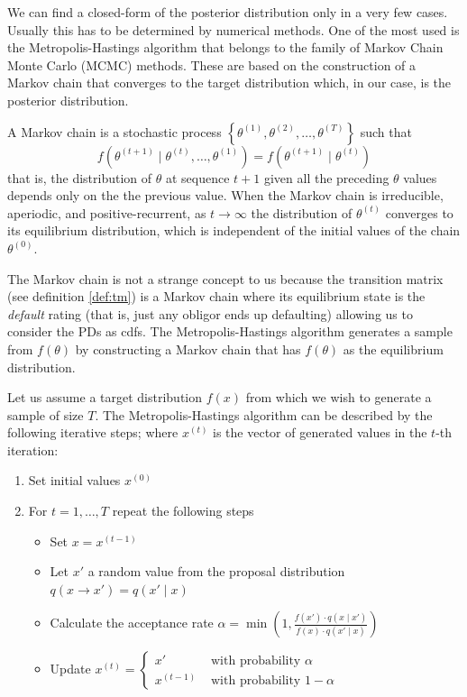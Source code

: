 \documentclass[11pt,fleqn]{book} %
\begin{document}
We can find a closed-form of the posterior distribution only in a very few 
cases. Usually this has to be determined by numerical methods. 
One of the most used is the Metropolis-Hastings algorithm that belongs to 
the family of Markov Chain Monte Carlo (MCMC) methods. These are based on 
the construction of a Markov chain that converges to the target distribution 
which, in our case, is the posterior distribution.

\begin{definition}
	A Markov chain is a stochastic process 
	$\left\{\theta^{(1)},\theta^{(2)},\dots,\theta^{(T)}\right\}$ such that
	\begin{displaymath}
		f\left(\theta^{(t+1)} \mid \theta^{(t)},\dots,\theta^{(1)}\right) = 
		f\left(\theta^{(t+1)} \mid \theta^{(t)}\right)
	\end{displaymath}
	that is, the distribution of $\theta$ at sequence $t+1$ given all the 
	preceding $\theta$ values depends only on the the previous value. 
	When the Markov chain is irreducible, aperiodic, and positive-recurrent, 
	as $t \to \infty$ the distribution of $\theta^{(t)}$ converges to its 
	equilibrium distribution, which is independent of the initial values 
	of the chain $\theta^{(0)}$.
\end{definition}

The Markov chain is not a strange concept to us because the transition 
matrix (see definition \ref{def:tm}) is a Markov chain where its 
equilibrium state is the \emph{default} rating (that is, just any 
obligor ends up defaulting) allowing us to consider the PDs as cdfs.
The Metropolis-Hastings algorithm generates a sample from $f(\theta)$ 
by constructing a Markov chain that has $f(\theta)$ as the equilibrium 
distribution.

\begin{algorithm}
	Let us assume a target distribution $f(x)$ from which we wish to 
	generate a sample of size $T$. The Metropolis-Hastings algorithm can 
	be described by the following iterative steps; where $x^{(t)}$ is the 
	vector of generated values in the $t$-th iteration:
	\begin{enumerate}
		\item Set initial values $x^{(0)}$
		\item For $t=1,\dots,T$ repeat the following steps
		\begin{itemize}
			\item Set $x=x^{(t-1)}$
			\item Let $x'$ a random value from the proposal distribution $q(x \to x')=q(x' \mid x)$
			\item Calculate the acceptance rate 
			$\alpha = \min\left(1,\frac{f(x') \cdot q(x \mid x')}{f(x) \cdot q(x' \mid x)}\right)$
			\item Update $x^{(t)}=\left\{
			\begin{array}{ll}
				x'        & \text{ with probability } \alpha   \\
				x^{(t-1)} & \text{ with probability } 1-\alpha 
			\end{array}\right.$ 
		\end{itemize}
	\end{enumerate}
\end{algorithm}
\end{document}
